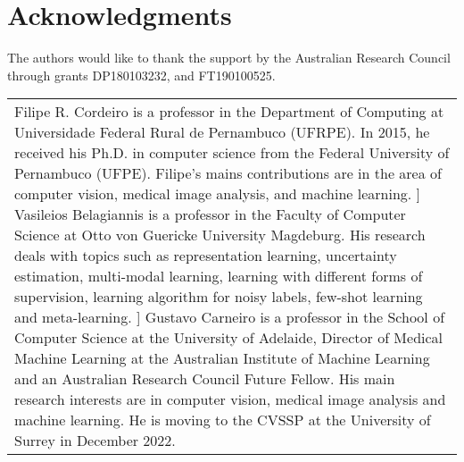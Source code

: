 \documentclass[review]{elsarticle}
\begin{document}
\section*{Acknowledgments}
The authors would like to thank the support by the Australian Research Council through grants DP180103232, and FT190100525.







\newpage

\begin{minipage}{0.3\textwidth}
\end{minipage}\hfill
\begin{minipage}{0.60\textwidth}\fontsize{8pt}{12pt}\selectfont
\begin{tabular}{p{\textwidth}}
\thispagestyle{empty}
Filipe R. Cordeiro is a professor in the Department of Computing at Universidade Federal Rural de Pernambuco (UFRPE). In 2015, he received his Ph.D. in computer science from the Federal University of Pernambuco (UFPE). Filipe’s mains contributions are in the area of computer vision, medical image analysis, and machine learning.
\1\baselineskip]
Vasileios Belagiannis is a professor in the Faculty of Computer Science at Otto von Guericke University Magdeburg. His research deals with topics such as representation learning, uncertainty estimation, multi-modal learning, learning with different forms of supervision, learning algorithm for noisy labels, few-shot learning and meta-learning.
\1\baselineskip]
Gustavo Carneiro is a professor in the School of Computer Science at the University of Adelaide, Director of Medical Machine Learning at the Australian Institute of Machine Learning and an Australian Research Council Future Fellow. His main research interests are in computer vision, medical image analysis and machine learning. He is moving to the CVSSP at the University of Surrey in December 2022.

\end{tabular}
\end{minipage}
\end{document}
